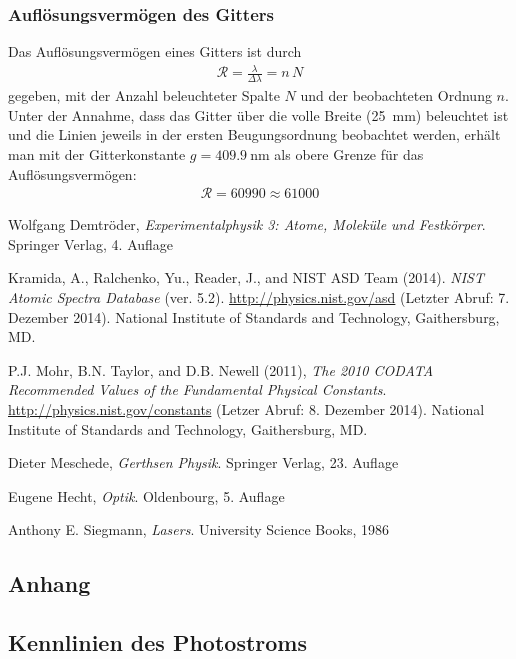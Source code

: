 \documentclass[11pt, a4paper]{article}
\numberwithin{equation}{section}
\begin{document}
\subsubsection{Auflösungsvermögen des Gitters}
Das Auflösungsvermögen eines Gitters ist durch
\begin{align*}
\mathcal{R}=\frac{\lambda}{\Delta\lambda}=n\,N
\end{align*}
gegeben, mit der Anzahl beleuchteter Spalte $N$ und der beobachteten Ordnung $n$. Unter der Annahme, dass das Gitter über die volle Breite (\SI{25}{\milli\metre}) beleuchtet ist und die Linien jeweils in der ersten Beugungsordnung beobachtet werden, erhält man mit der Gitterkonstante $g=\SI{409.9}{\nano\metre}$ als obere Grenze für das Auflösungsvermögen:
\begin{align*}
\mathcal{R}=60990\approx 61000
\end{align*}


\begin{thebibliography}{9}
	Wolfgang Demtröder,
	\emph{Experimentalphysik 3: Atome, Moleküle und Festkörper}.
	Springer Verlag,
	4. Auflage

	Kramida, A., Ralchenko, Yu., Reader, J., and NIST ASD Team (2014).
	\emph{NIST Atomic Spectra Database} (ver. 5.2).
	\url{http://physics.nist.gov/asd} (Letzter Abruf: 7. Dezember 2014).
	National Institute of Standards and Technology, Gaithersburg, MD.

	P.J. Mohr, B.N. Taylor, and D.B. Newell (2011),
	\emph{The 2010 CODATA Recommended Values of the Fundamental Physical Constants}.
	\url{http://physics.nist.gov/constants} (Letzer Abruf: 8. Dezember 2014).
	National Institute of Standards and Technology, Gaithersburg, MD.
	
	Dieter Meschede,
	\emph{Gerthsen Physik}.
	Springer Verlag,
	23. Auflage

	Eugene Hecht,
	\emph{Optik}.
	Oldenbourg,
	5. Auflage

	Anthony E. Siegmann,
	\emph{Lasers}.
	University Science Books,
	1986

 
\end{thebibliography}

\begin{appendix}
\section{Anhang}
\subsection{Kennlinien des Photostroms}
\label{app:kennlinien}
\FloatBarrier


\end{appendix}
\end{document}
